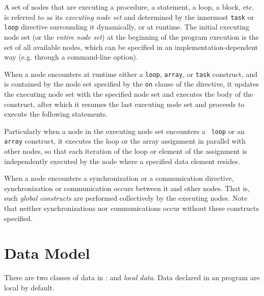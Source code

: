 


A set of nodes that are executing a procedure, a statement, a loop,
a block, etc. is referred to as its {\it executing node set} and
determined by the innermost {\tt task} or {\tt loop} directive
surrounding it dynamically, or at runtime.
%
The initial executing node set (or the {\it entire node set}) at the
beginning of the program execution is the set of all available nodes,
which can be specified in an implementation-dependent way (e.g. through
a command-line option).

When a node encounters at runtime either a {\tt loop}, {\tt array}, or
{\tt task} construct, and is contained by the node set specified by the
{\tt on} clause of the directive, it updates the executing node set with
the specified node set and executes the body of the construct, after
which it resumes the last executing node set and proceeds to execute the
following statements.

Particularly when a node in the executing node set encounters a {\tt
loop} or an {\tt array} construct, it executes the loop or the array
assignment in parallel with other nodes, so that each iteration of the
loop or element of the assignment is independently executed by the node
where a specified data element resides.

When a node encounters a synchronization or a communication directive,
synchronization or communication occurs between it and other nodes.
%
That is, such {\it global constructs} are performed collectively by the
executing nodes.
%
Note that neither synchronizations nor communications occur without these
constructs specified.


\section{Data Model}


There are two classes of data in {\XMP}: {\it {}} and
{\it local data}. Data declared in an {\XMP} program are local by
default.

